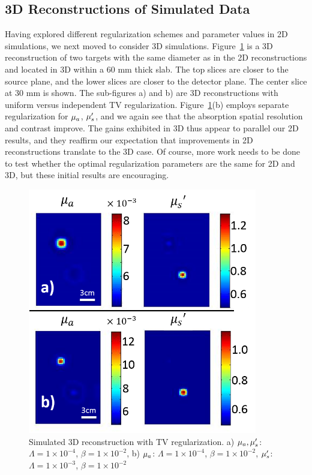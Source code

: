 \subsection{3D Reconstructions of Simulated Data}
Having explored different regularization schemes and parameter values in 2D simulations, we next moved to consider 3D simulations. Figure~\ref{fig:3Dsim} is a 3D reconstruction of two targets with the same diameter as in the 2D reconstructions and located in 3D within a $60$ mm thick slab. The top slices are closer to the source plane, and the lower slices are closer to the detector plane. The center slice at $30$ mm is shown. The sub-figures a) and b) are 3D reconstructions with uniform versus independent TV regularization. Figure~\ref{fig:3Dsim}(b) employs separate regularization for $\mu_a$, $\mu_s^{\prime}$, and we again see that the absorption spatial resolution and contrast improve. The gains exhibited in 3D thus appear to parallel our 2D results, and they reaffirm our expectation that improvements in 2D reconstructions translate to the 3D case. Of course, more work needs to be done to test whether the optimal regularization parameters are the same for 2D and 3D, but these initial results are encouraging.
\begin{figure}[t]
\begin{center}
\includegraphics[width=10cm]{./figures/4_Gen3/3Dsim.png}
\caption[Simulated 3D reconstruction with TV regularization]{Simulated 3D reconstruction with TV regularization. a) $\mu_a,\mu_s^{\prime}$: $\Lambda=1\times10^{-4}$, $\beta=1\times10^{-2}$, b) $\mu_a$: $\Lambda=1\times10^{-4}$, $\beta=1\times10^{-2}$, $\mu_s^{\prime}$: $\Lambda=1\times10^{-3}$, $\beta=1\times10^{-2}$}
\label{fig:3Dsim}
\end{center}
\end{figure}
